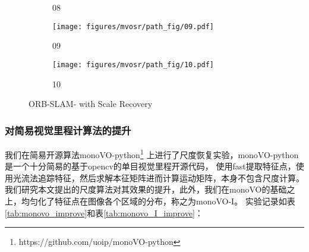 \begin{figure}
\begin{subfigure}[b]{0.18\textwidth}
    \caption{08}
    \label{fig:orb_path_08}
    \vspace*{2mm}
    \end{subfigure}
    \begin{subfigure}[b]{0.18\textwidth}
        \texttt{[image: figures/mvosr/path\_fig/09.pdf]}

    \caption{09}
    \label{fig:orb_path_09}
    \vspace*{2mm}
    \end{subfigure}
    \begin{subfigure}[b]{0.18\textwidth}
        \texttt{[image: figures/mvosr/path\_fig/10.pdf]}

    \caption{10}
    \label{fig:orb_path_10}
    \vspace*{2mm}
    \end{subfigure}   
    \caption{ORB-SLAM- with Scale Recovery}
    {\label{fig:orn_scale_recovery}}
    
    \end{figure}


\subsubsection{对简易视觉里程计算法的提升}
我们在简易开源算法monoVO-python\footnote{https://github.com/uoip/monoVO-python}
上进行了尺度恢复实验，monoVO-python是一个十分简易的基于opencv的单目视觉里程开源代码，
使用fast提取特征点，使用光流法追踪特征，然后求解本征矩阵进而计算运动矩阵，本身不包含尺度计算。
我们研究本文提出的尺度算法对其效果的提升，此外，我们在monoVO的基础之上，均匀化了特征点在图像各个区域的分布，称之为monoVO-I。
实验记录如表\ref{tab:monovo_improve}和表\ref{tab:monovo_I_improve}：


